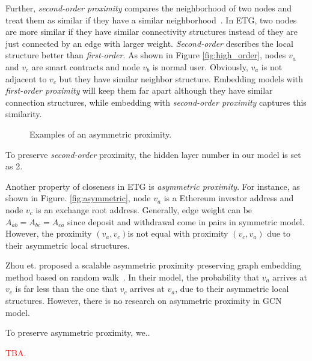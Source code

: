 Further, \emph{second-order proximity} compares the neighborhood of two nodes and treat them as similar if they have a similar neighborhood~\cite{goyal2018graph}. In ETG, two nodes are more similar if they have similar connectivity structures instead of they are just connected by an edge with larger weight. \emph{Second-order} describes the local structure better than \emph{first-order}. As shown in Figure \ref{fig:high_order}, nodes $v_a$ and $v_c$ are smart contracts and node $v_b$ is normal user. Obviously, $v_a$ is not adjacent to $v_c$  but they have similar neighbor structure. Embedding models with \emph{first-order proximity} will keep them far apart although they have similar connection structures, while embedding with \emph{second-order proximity} captures this similarity.


\begin{figure}[htbp]
	\centering
	\caption{Examples of an asymmetric proximity.}

\end{figure}

To preserve \emph{second-order} proximity, the hidden layer number in our model is set as 2.

Another property of closeness in ETG is \emph{asymmetric proximity}. For instance, as shown in Figure. \ref{fig:asymmetric}, node $v_a$ is a Ethereum investor address and node $v_c$ is an exchange root address. Generally, edge weight can be $A_{ab}=A_{bc}=A_{ca}$ since deposit and withdrawal come in pairs in symmetric model. However, the proximity $(v_a,v_c)$is not equal with proximity $(v_c,v_a)$ due to their asymmetric local structures.


 Zhou et. proposed a scalable asymmetric proximity preserving graph embedding method based on random walk~\cite{zhou2017scalable}. In their model, the probability that $v_a$ arrives at $v_c$ is far less than the one that $v_c$ arrives at $v_a$, due to their asymmetric local structures. However, there is no research on asymmetric proximity in GCN model.
 
 To preserve asymmetric proximity, we..
 
 \textcolor{red}{TBA.}


